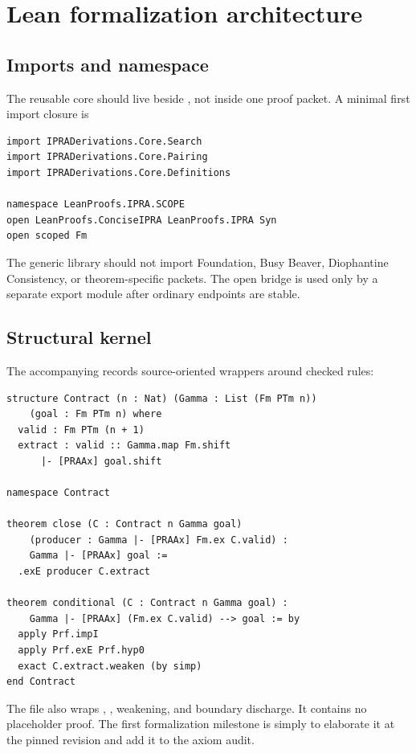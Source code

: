 \section{Lean formalization architecture}
\label{sec:lean}

\subsection{Imports and namespace}

The reusable core should live beside , not inside one
proof packet.  A minimal first import closure is

\begin{lstlisting}
import IPRADerivations.Core.Search
import IPRADerivations.Core.Pairing
import IPRADerivations.Core.Definitions

namespace LeanProofs.IPRA.SCOPE
open LeanProofs.ConciseIPRA LeanProofs.IPRA Syn
open scoped Fm
\end{lstlisting}

The generic library should not import Foundation, Busy Beaver, Diophantine
Consistency, or theorem-specific packets.  The open bridge is used only by a
separate export module after ordinary endpoints are stable.

\subsection{Structural kernel}

The accompanying  records source-oriented wrappers
around checked rules:

\begin{lstlisting}
structure Contract (n : Nat) (Gamma : List (Fm PTm n))
    (goal : Fm PTm n) where
  valid : Fm PTm (n + 1)
  extract : valid :: Gamma.map Fm.shift
      |- [PRAAx] goal.shift

namespace Contract

theorem close (C : Contract n Gamma goal)
    (producer : Gamma |- [PRAAx] Fm.ex C.valid) :
    Gamma |- [PRAAx] goal :=
  .exE producer C.extract

theorem conditional (C : Contract n Gamma goal) :
    Gamma |- [PRAAx] (Fm.ex C.valid) --> goal := by
  apply Prf.impI
  apply Prf.exE Prf.hyp0
  exact C.extract.weaken (by simp)
end Contract
\end{lstlisting}

The file also wraps , , weakening, and boundary
discharge.  It contains no placeholder proof.  The first formalization
milestone is simply to elaborate it at the pinned revision and add it to the
axiom audit.

